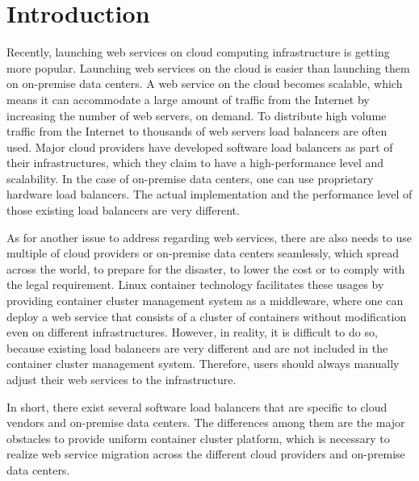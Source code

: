 \section{Introduction}

Recently, launching web services on cloud computing infrastructure is getting more popular.
Launching web services on the cloud is easier than launching them on on-premise data centers.
A web service on the cloud becomes scalable, which means it can accommodate a large amount of traffic from the Internet by increasing the number of web servers, on demand.
To distribute high volume traffic from the Internet to thousands of web servers load balancers are often used.
Major cloud providers have developed software load balancers\cite{eisenbud2016maglev,patel2013ananta} as part of their infrastructures, which they claim to have a high-performance level and scalability.
In the case of on-premise data centers, one can use proprietary hardware load balancers.
The actual implementation and the performance level of those existing load balancers are very different.

As for another issue to address regarding web services,
there are also needs to use multiple of cloud providers or on-premise data centers seamlessly, which spread across the world, to prepare for the disaster, to lower the cost or to comply with the legal requirement.
Linux container technology\cite{menage2007adding} facilitates these usages by providing container cluster management system as a middleware,
where one can deploy a web service that consists of a cluster of containers without modification even on different infrastructures.
However, in reality, it is difficult to do so, because existing load balancers are very different and are not included in the container cluster management system.
Therefore, users should always manually adjust their web services to the infrastructure.

In short, there exist several software load balancers that are specific to cloud vendors and on-premise data centers.
The differences among them are the major obstacles to provide uniform container cluster platform, which is necessary to realize web service migration across the different cloud providers and on-premise data centers.

